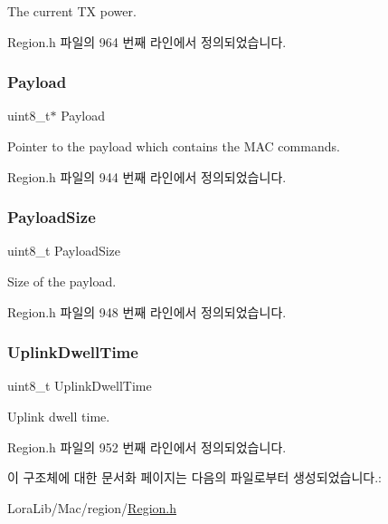 The current TX power. 

Region.\+h 파일의 964 번째 라인에서 정의되었습니다.

\mbox{\label{structs_link_adr_req_params_a3dfbfe76c8f3bd25765750487b815147}} 
\subsubsection{\texorpdfstring{Payload}{Payload}}
{\footnotesize\ttfamily uint8\+\_\+t$\ast$ Payload}

Pointer to the payload which contains the M\+AC commands. 

Region.\+h 파일의 944 번째 라인에서 정의되었습니다.

\mbox{\label{structs_link_adr_req_params_a65009968bd973163423516e80a11c82f}} 
\subsubsection{\texorpdfstring{Payload\+Size}{PayloadSize}}
{\footnotesize\ttfamily uint8\+\_\+t Payload\+Size}

Size of the payload. 

Region.\+h 파일의 948 번째 라인에서 정의되었습니다.

\mbox{\label{structs_link_adr_req_params_a0e6663762d6f9173bc8d8cb018f8f17a}} 
\subsubsection{\texorpdfstring{Uplink\+Dwell\+Time}{UplinkDwellTime}}
{\footnotesize\ttfamily uint8\+\_\+t Uplink\+Dwell\+Time}

Uplink dwell time. 

Region.\+h 파일의 952 번째 라인에서 정의되었습니다.



이 구조체에 대한 문서화 페이지는 다음의 파일로부터 생성되었습니다.\+:\begin{DoxyCompactItemize}
\item 
Lora\+Lib/\+Mac/region/\mbox{\hyperlink{_region_8h}{Region.\+h}}\end{DoxyCompactItemize}
